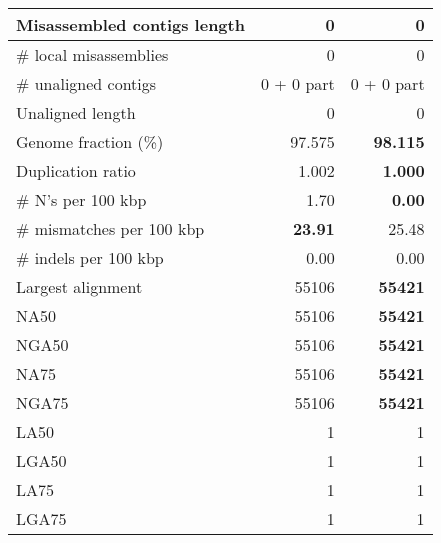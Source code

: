 \documentclass[12pt,a4paper]{article}
\begin{document}
\begin{table}[ht]
\begin{center}
\begin{tabular}{|l*{2}{|r}|}
Misassembled contigs length & 0 & 0 \\ \hline
\# local misassemblies & 0 & 0 \\ \hline
\# unaligned contigs & 0 + 0 part & 0 + 0 part \\ \hline
Unaligned length & 0 & 0 \\ \hline
Genome fraction (\%) & 97.575 & {\bf 98.115} \\ \hline
Duplication ratio & 1.002 & {\bf 1.000} \\ \hline
\# N's per 100 kbp & 1.70 & {\bf 0.00} \\ \hline
\# mismatches per 100 kbp & {\bf 23.91} & 25.48 \\ \hline
\# indels per 100 kbp & 0.00 & 0.00 \\ \hline
Largest alignment & 55106 & {\bf 55421} \\ \hline
NA50 & 55106 & {\bf 55421} \\ \hline
NGA50 & 55106 & {\bf 55421} \\ \hline
NA75 & 55106 & {\bf 55421} \\ \hline
NGA75 & 55106 & {\bf 55421} \\ \hline
LA50 & 1 & 1 \\ \hline
LGA50 & 1 & 1 \\ \hline
LA75 & 1 & 1 \\ \hline
LGA75 & 1 & 1 \\ \hline
\end{tabular}
\end{center}
\end{table}
\end{document}
